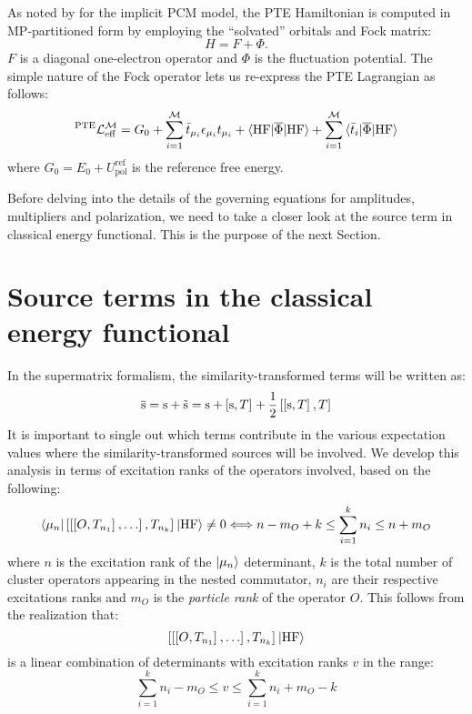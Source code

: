 As noted by \citeauthor{Cammi2009-gu} for the implicit \acs{PCM} model,
the \acs{PTE} Hamiltonian is computed in \acs{MP}-partitioned form by
employing the ``solvated'' orbitals and Fock matrix:
\begin{equation}
  H = F + \Phi.
\end{equation}
$F$ is a diagonal one-electron operator and $\Phi$ is the
fluctuation potential.
The simple nature of the Fock operator lets us re-express the \acs{PTE}
Lagrangian as follows:
\begin{equation}
{}^\mathrm{PTE}\mathcal{L}^\mathcal{M}_\mathrm{eff}
  =
  G_0
  + \sum_{i=1}^{\mathcal{M}}\bar{t}_{\mu_i}\epsilon_{\mu_i}t_{\mu_i}
  + \braket{\mathrm{HF} | \overline{\Phi} | \mathrm{HF}}
  + \sum_{i=1}^{\mathcal{M}}\braket{\bar{t}_{i} | \overline{\Phi} | \mathrm{HF}}
\end{equation}
where $G_0 = E_0 + U_\mathrm{pol}^\mathrm{ref}$ is the reference free
energy.

Before delving into the details of the governing equations for
amplitudes, multipliers and polarization, we need to take a closer look
at the source term in classical energy functional. This is the purpose
of the next Section.

\section{Source terms in the classical energy functional}

In the supermatrix formalism, the similarity-transformed terms will be
written as:
\begin{equation}
  \overline{\mathrm{s}} = \mathrm{s} + \tilde{\mathrm{s}} = \mathrm{s} +
  \left[ \mathrm{s}, T \right]^{} +
  \frac{1}{2}\left[ \left[ \mathrm{s}, T \right]^{}, T \right]^{}
\end{equation}
It is important to single out which terms contribute in the various
expectation values where the similarity-transformed sources will be
involved.
We develop this analysis in terms of excitation ranks of the operators
involved, based on the following:
\begin{equation}
  \braket{\mu_n |
  \left[ \left[ \left[ O, T_{n_1} \right]^{}, \ldots \right]^{}, T_{n_k} \right]^{} | \mathrm{HF}} \neq 0
  \Longleftrightarrow
  n - m_O + k \leq \sum_{i=1}^k n_i \leq n + m_O
\end{equation}
where $n$ is the excitation rank of the $\ket{\mu_n}$ determinant, $k$
is the total number of cluster operators appearing in the nested
commutator, $n_i$ are their respective excitations ranks and $m_O$
is the \emph{particle rank} of the operator $O$.\autocite{Helgaker2000-tz}
This follows from the realization that:
\begin{equation}
  \left[ \left[ \left[ O, T_{n_1} \right]^{}, \ldots \right]^{}, T_{n_k} \right]^{} \ket{\mathrm{HF}}
\end{equation}
is a linear combination of determinants with excitation ranks $v$ in the
range:
\begin{equation}
  \sum_{i=1}^k n_i - m_O \leq v \leq \sum_{i=1}^k n_i + m_O -k
\end{equation}

